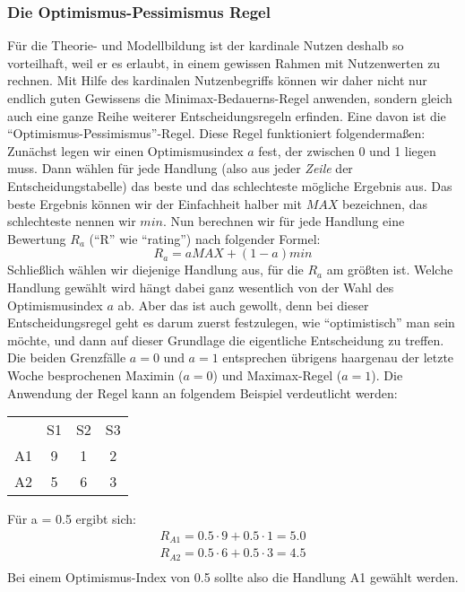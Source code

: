 \subsubsection{Die Optimismus-Pessimismus Regel}

Für die Theorie- und Modellbildung ist der kardinale Nutzen deshalb so
vorteilhaft, weil er es erlaubt, in einem gewissen Rahmen mit Nutzenwerten zu
rechnen. Mit Hilfe des kardinalen Nutzenbegriffs können wir daher nicht nur
endlich guten Gewissens die Minimax-Bedauerns-Regel anwenden, sondern gleich
auch eine ganze Reihe weiterer Entscheidungsregeln erfinden. Eine davon ist die
"`Optimismus-Pessimismus"'-Regel. Diese Regel funktioniert folgendermaßen:
Zunächst legen wir einen Optimismusindex $a$ fest, der zwischen 0 und 1
liegen muss. Dann wählen für jede Handlung (also aus jeder {\em Zeile} der
Entscheidungstabelle) das beste und das schlechteste mögliche Ergebnis
aus. Das beste Ergebnis können wir der Einfachheit halber mit $MAX$
bezeichnen, das schlechteste nennen wir $min$. Nun berechnen wir für jede
Handlung eine Bewertung $R_a$ ("`R"' wie "`rating"') nach folgender Formel:
\begin{displaymath}
R_a = aMAX + (1-a)min
\end{displaymath}
Schließlich wählen wir diejenige Handlung aus, für die $R_a$ am größten ist.
Welche Handlung gewählt wird hängt dabei ganz wesentlich von der Wahl des
Optimismusindex $a$ ab. Aber das ist auch gewollt, denn bei dieser
Entscheidungsregel geht es darum zuerst festzulegen, wie "`optimistisch"' man
sein möchte, und dann auf dieser Grundlage die eigentliche Entscheidung zu
treffen. Die beiden Grenzfälle $a=0$ und $a=1$ entsprechen übrigens
haargenau der letzte Woche besprochenen Maximin ($a=0$) und Maximax-Regel
($a=1$). Die Anwendung der Regel kann an folgendem Beispiel verdeutlicht werden:
\begin{center}
\begin{tabular}{c|c|c|c|}
\multicolumn{1}{c}{}  & \multicolumn{1}{c}{S1}  & \multicolumn{1}{c}{S2}  & 
\multicolumn{1}{c}{S3} 
\\ \cline{2-4}
 A1 & 9 & 1 & 2 \\ \cline{2-4}
 A2 & 5 & 6 & 3 \\ \cline{2-4}
\end{tabular}
\end{center}
Für a = 0.5 ergibt sich:
\begin{eqnarray*}
& R_{A1} = 0.5 \cdot 9 + 0.5 \cdot 1 = 5.0 & \\
& R_{A2} = 0.5 \cdot 6 + 0.5 \cdot 3 = 4.5 & \\
\end{eqnarray*}
Bei einem Optimismus-Index von 0.5 sollte also die Handlung A1 gewählt werden.

